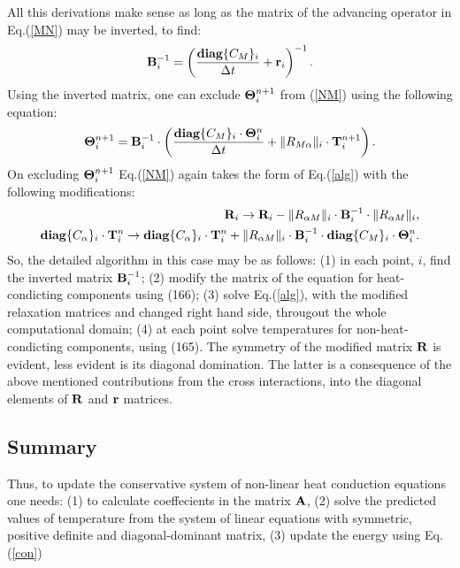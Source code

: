 All this derivations make sense as long as the matrix of the advancing operator in Eq.(\ref{MN}) may be inverted, to find:
\begin{equation}
{\bf B}_i^{-1}=\left(\frac{{\bf diag}\{C_M\}_i}{\Delta t}+{\bf r}_i\right)^{-1}.
\end{equation}
Using the inverted matrix, one can exclude ${\bf \Theta}^{n+1}_i$ from (\ref{NM}) using the following equation:
\begin{equation}
{\bf \Theta}^{n+1}_i={\bf B}_i^{-1}\cdot\left(\frac{{\bf diag}\{C_M\}_i\cdot{\bf \Theta}^{n}_i}{\Delta t}+ \|R_{ M \alpha}\|_i\cdot{\bf T}_i^{n+1}\right).\label{solveM}
\end{equation}
On excluding ${\bf \Theta}^{n+1}_i$ Eq.(\ref{NM}) again takes the form of Eq.(\ref{alg}) with the following modifications:
\begin{eqnarray}
{\bf R}_i\rightarrow {\bf R}_i-\|R_{\alpha M}\|_i\cdot{\bf B}_i^{-1}\cdot\|R_{\alpha M}\|_i,\nonumber\\%
{\bf diag}\{C_\alpha\}_i\cdot{\bf T}^{n}_i\rightarrow 
{\bf diag}\{C_\alpha\}_i\cdot{\bf T}^{n}_i+\|R_{\alpha M}\|_i\cdot{\bf B}_i^{-1}\cdot {\bf diag}\{C_M\}_i\cdot{\bf \Theta}^{n}_i.\label{solveN}
\end{eqnarray}
So, the detailed algorithm in this case may be as follows: (1) in each point, $i$, find the inverted matrix ${\bf B}_i^{-1}$; (2) modify the matrix of the equation
for heat-condicting components using (166); (3) solve Eq.(\ref{alg}), with the modified relaxation matrices and changed right hand side, througout the
whole computational domain; (4) at each point solve temperatures for non-heat-condicting components, using (165). The symmetry of the modified matrix ${\bf R}$ is
evident, less evident is its diagonal domination. The latter is a consequence of the above mentioned contributions from the cross interactions, into the diagonal elements of 
${\bf R}$ and ${\bf r}$ matrices.


\subsection{Summary}
Thus, to update the conservative system of non-linear heat conduction equations one needs: (1) to calculate coeffecients in the matrix ${\bf A}$, 
(2) solve the predicted values of temperature from the system of linear equations with symmetric, positive definite and diagonal-dominant matrix, 
(3) update the energy using Eq.(\ref{con})

%

